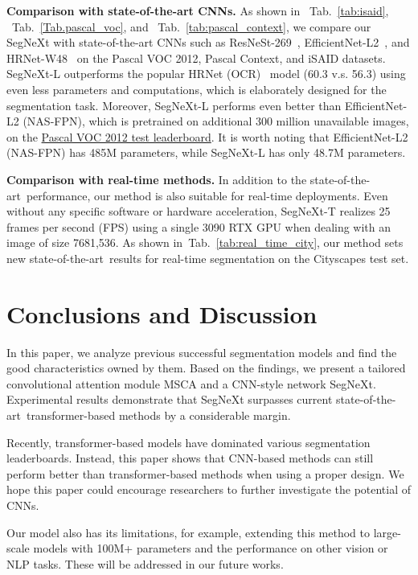 \documentclass{article}
\def\sArt{state-of-the-art~}
\newcommand{\tabref}[1]{Tab.~\ref{#1}}
\begin{document}
\textbf{Comparison with state-of-the-art CNNs.}
As shown in ~\tabref{tab:isaid}, ~\tabref{Tab.pascal_voc}, and ~\tabref{tab:pascal_context},
we compare our SegNeXt with state-of-the-art CNNs 
such as ResNeSt-269~\cite{zhang2020resnest}, EfficientNet-L2~\cite{zoph2020rethinking},
and HRNet-W48~\cite{wang2020deep} on the Pascal VOC 2012, Pascal Context, and iSAID datasets.
SegNeXt-L outperforms the popular HRNet (OCR)~\cite{wang2020deep,yuan2020object} model (60.3 v.s. 56.3) using even less parameters and computations, which is elaborately designed for the segmentation task.
Moreover, SegNeXt-L performs even better than EfficientNet-L2 (NAS-FPN), which is
pretrained on additional 300 million unavailable images, on the \href{http://host.robots.ox.ac.uk:8080/anonymous/HRSC5B.html}{Pascal VOC 2012 test leaderboard}.
It is worth noting that EfficientNet-L2 (NAS-FPN) has 485M parameters, while SegNeXt-L has only 48.7M parameters.


\textbf{Comparison with real-time methods.} 
In addition to the \sArt performance, our method is also suitable for real-time deployments.
Even without any specific software or hardware acceleration, SegNeXt-T realizes 25 frames per second (FPS) using a single 3090 RTX GPU when dealing with an image of size 7681,536.
As shown in~\tabref{tab:real_time_city}, our method sets new \sArt results for real-time segmentation on the Cityscapes test set.




\section{Conclusions and Discussion}

In this paper, we analyze previous successful segmentation models and
find the good characteristics owned by them.
Based on the findings, we present a tailored convolutional attention module MSCA and a 
CNN-style network SegNeXt.
Experimental results demonstrate that 
SegNeXt surpasses current \sArt transformer-based methods by a considerable margin.


Recently, transformer-based models have dominated various segmentation leaderboards.
Instead, this paper shows that CNN-based methods can still perform better than transformer-based methods when using a proper design.
We hope this paper could encourage researchers to further investigate the potential of CNNs.

Our model also has its limitations, for example, extending this method to large-scale models with 100M+ parameters and the performance on other vision or NLP tasks.
These will be addressed in our future works.
\end{document}
